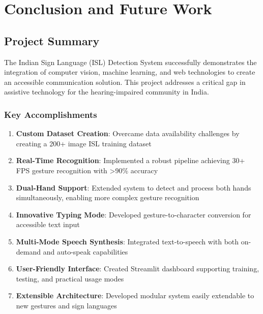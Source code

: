 \chapter{Conclusion and Future Work}

\section{Project Summary}

The Indian Sign Language (ISL) Detection System successfully demonstrates the integration of computer vision, machine learning, and web technologies to create an accessible communication solution. This project addresses a critical gap in assistive technology for the hearing-impaired community in India.

\subsection{Key Accomplishments}

\begin{enumerate}
    \item \textbf{Custom Dataset Creation}: Overcame data availability challenges by creating a 200+ image ISL training dataset
    
    \item \textbf{Real-Time Recognition}: Implemented a robust pipeline achieving 30+ FPS gesture recognition with >90\% accuracy
    
    \item \textbf{Dual-Hand Support}: Extended system to detect and process both hands simultaneously, enabling more complex gesture recognition
    
    \item \textbf{Innovative Typing Mode}: Developed gesture-to-character conversion for accessible text input
    
    \item \textbf{Multi-Mode Speech Synthesis}: Integrated text-to-speech with both on-demand and auto-speak capabilities
    
    \item \textbf{User-Friendly Interface}: Created Streamlit dashboard supporting training, testing, and practical usage modes
    
    \item \textbf{Extensible Architecture}: Developed modular system easily extendable to new gestures and sign languages
\end{enumerate}

